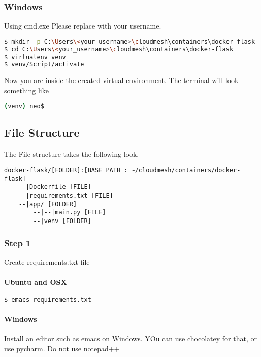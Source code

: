 \subsubsection{Windows}

Using cmd.exe Please replace with your username.

\begin{lstlisting}[language=bash]
$ mkdir -p C:\Users\<your_username>\cloudmesh\containers\docker-flask
$ cd C:\Users\<your_username>\cloudmesh\containers\docker-flask
$ virtualenv venv
$ venv/Script/activate
\end{lstlisting}

Now you are inside the created virtual environment. The terminal will
look something like

\begin{lstlisting}[language=bash]
(venv) neo$
\end{lstlisting}

\subsection{File Structure}

The File structure takes the following look.

\begin{lstlisting}
docker-flask/[FOLDER]:[BASE PATH : ~/cloudmesh/containers/docker-flask]
    --|Dockerfile [FILE]
    --|requirements.txt [FILE]
    --|app/ [FOLDER]
        --|--|main.py [FILE]
        --|venv [FOLDER]
\end{lstlisting}

\subsubsection{Step 1}

Create requirements.txt file

\paragraph{Ubuntu and OSX}

\begin{lstlisting}[language=bash]
$ emacs requirements.txt
\end{lstlisting}

\paragraph{Windows}

Install an editor such as emacs on Windows. YOu can use chocolatey for
that, or use pycharm. Do not use notepad++

